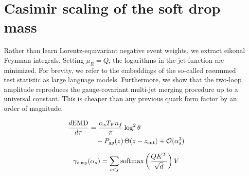 \section{Casimir scaling of the soft drop mass}\label{sec:casimir-scaling-soft}

Rather than learn Lorentz-equivariant negative event weights, we extract
eikonal Feynman integrals. Setting $\mu_R = Q$, the logarithms in the
jet function are minimized. For brevity, we refer to the embeddings of
the so-called resummed test statistic as large language models.
Furthermore, we show that the two-loop amplitude reproduces the
gauge-covariant multi-jet merging procedure up to a universal constant.
This is cheaper than any previous quark form factor by an order of
magnitude.

\begin{align}
  \frac{d \mathrm{EMD}}{d \tau} &= \frac{\alpha_s T_F n_f}{\pi} \log^2 \theta \nonumber \\
  &\quad + P_{gg}(z) \, \Theta(z - z_{\rm cut}) + \mathcal{O}(\alpha_s^3) \label{eq:2}
\end{align}

\begin{equation}
  \gamma_{\rm cusp}(\alpha_s) = \sum_{i<j} \mathrm{softmax}\left(\frac{Q K^T}{\sqrt{d}}\right) V
  \label{eq:3}
\end{equation}

